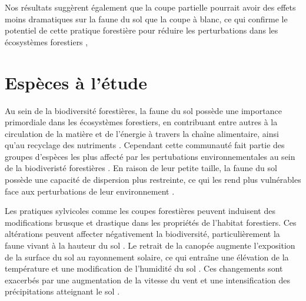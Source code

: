 Nos résultats suggèrent également que la coupe partielle pourrait avoir des effets moins dramatiques sur la faune du sol que la coupe à blanc, 
ce qui confirme le potentiel de cette pratique forestière pour réduire les perturbations dans les écosystèmes forestiers \citep{Kudrin2023metaanalysiseffects},



\section*{Espèces à l'étude}
\label{sec:species}

Au sein de la biodiversité forestières, la faune du sol possède une importance primordiale dans les écosystèmes forestiers, en contribuant entre autres à la circulation de la matière et de l'énergie à travers la chaîne alimentaire, ainsi qu'au recyclage des nutriments \citep{Seibold2021contributioninsects,Kudrin2023metaanalysiseffects}.
Cependant cette communauté fait partie des groupes d'espèces les plus affecté par les pertubations environnementales au sein de la biodiveristé forestières \citep{Marshall2000Impactsforest,Coyle2017Soilfauna}. 
En raison de leur petite taille, la faune du sol possède une capacité de dispersion plus restreinte, ce qui les rend plus vulnérables face aux perturbations de leur environnement \citep{Kudrin2023metaanalysiseffects}.


Les pratiques sylvicoles comme les coupes forestières peuvent induisent des modifications brusque et drastique dans les propriétés de l'habitat forestiers. 
Ces altérations peuvent affecter négativement la biodiversité, particulièrement la faune vivant à la hauteur du sol \citep{Lindo2003Microbialbiomass,Paillet2010Biodiversitydifferences,Fedrowitz2014Canretention,Chaudhary2016Impactforest}. 
Le retrait de la canopée augmente l'exposition de la surface du sol au rayonnement solaire, ce qui entraîne une élévation de la température et une modification de l'humidité du sol \citep{Lindo2003Microbialbiomass,Brook2008Synergiesextinction,Zhang2022Intensiveforest}. 
Ces changements sont exacerbés par une augmentation de la vitesse du vent et une intensification des précipitations atteignant le sol \citep{Keenan1993ecologicaleffects,Heithecker2007Edgerelatedgradients}. 


